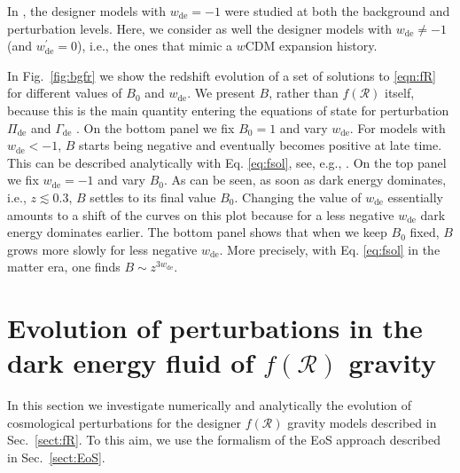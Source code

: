 \documentclass[nofootinbib,a4paper,aps,prd,10pt,superscriptaddress,reprint,showkeys,showpacs]{revtex4-1}
\newcommand{\qsubrm}[2]{{#1}_{\scriptscriptstyle{\textrm{#2}}}}
\begin{document}
In \citep{Song2007,Battye2016a}, the designer models with $\qsubrm{w}{de}=-1$ were studied at both the 
background and perturbation levels. Here, we consider as well the designer models with $\qsubrm{w}{de}\neq-1$ (and 
$\qsubrm{w}{de}^\prime=0$), i.e., the ones that mimic a $w$CDM expansion history.

In Fig.~\ref{fig:bgfr} we show the redshift evolution of a set of solutions to \eqref{eqn:fR} for different values 
of $\qsubrm{B}{0}$ and $\qsubrm{w}{de}$. We present $B$, rather than $f(\mathcal{R})$ itself, because this is the main 
quantity entering the equations of state for perturbation $\qsubrm{\Pi}{de}$ and $\qsubrm{\Gamma}{de}$ 
\cite{Battye2016a}. On the bottom panel we fix $\qsubrm{B}{0}=1$ and vary $\qsubrm{w}{de}$. For models with 
$\qsubrm{w}{de}<-1$, $B$ starts being negative and eventually becomes positive at late time. This can be described 
analytically with Eq. \eqref{eq:fsol}, see, e.g., \citep{Song2007}. On the top panel we fix $\qsubrm{w}{de}=-1$ and 
vary $\qsubrm{B}{0}$. As can be seen, as soon as dark energy dominates, i.e., $z\lesssim 0.3$, $B$ settles to its final 
value $\qsubrm{B}{0}$. Changing the value of $\qsubrm{w}{de}$ essentially amounts to a shift of the curves on this plot 
because for a less negative $\qsubrm{w}{de}$ dark energy dominates earlier. The bottom panel shows that when we keep 
$\qsubrm{B}{0}$ fixed, $B$ grows more slowly for less negative $\qsubrm{w}{de}$. More precisely, with Eq. 
\eqref{eq:fsol} in the matter era, one finds $B\sim z^{3\qsubrm{w}{de}}$.


\section{Evolution of perturbations in the dark energy fluid of \texorpdfstring{$f(\mathcal{R})$}{f(R)} gravity}
\label{sect:results}
In this section we investigate numerically and analytically the evolution of cosmological perturbations for the 
designer $f(\mathcal{R})$ gravity models described in Sec.~\ref{sect:fR}. To this aim, we use the formalism of the 
EoS approach described in Sec.~\ref{sect:EoS}.
\end{document}
